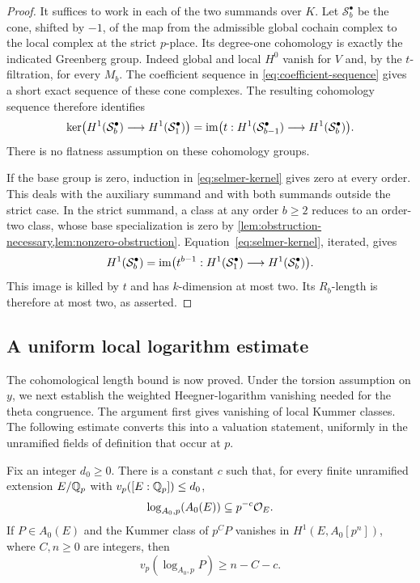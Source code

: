 \begin{proof}
It suffices to work in each of the two summands over $K$.
Let $\mathcal S_b^\bullet$ be the cone, shifted by $-1$, of the
map from the admissible global cochain complex to the local
complex at the strict $p$-place.  Its degree-one cohomology is
exactly the indicated Greenberg group.  Indeed global and local
$H^0$ vanish for $V$ and, by the $t$-filtration, for every $M_b$.
The coefficient sequence in \cref{eq:coefficient-sequence} gives a
short exact sequence of these cone complexes.  The resulting
cohomology sequence therefore identifies
\begin{equation}\label{eq:selmer-kernel}
 \ker\bigl(H^1(\mathcal S_b^\bullet)
       \longrightarrow H^1(\mathcal S_1^\bullet)\bigr)
 =\operatorname{im}\bigl(t:H^1(\mathcal S_{b-1}^\bullet)
       \longrightarrow H^1(\mathcal S_b^\bullet)\bigr).
\end{equation}
There is no flatness assumption on these cohomology groups.

If the base group is zero, induction in \cref{eq:selmer-kernel}
gives zero at every order.  This deals with the auxiliary summand
and with both summands outside the strict case.  In the strict
summand, a class at any order $b\ge2$ reduces to an order-two
class, whose base specialization is zero by
\cref{lem:obstruction-necessary,lem:nonzero-obstruction}.
Equation~\eqref{eq:selmer-kernel}, iterated, gives
\[
 H^1(\mathcal S_b^\bullet)
   =\operatorname{im}\bigl(t^{b-1}:H^1(\mathcal S_1^\bullet)
                    \longrightarrow H^1(\mathcal S_b^\bullet)\bigr).
\]
This image is killed by $t$ and has $k$-dimension at most two.
Its $R_b$-length is therefore at most two, as asserted.
\end{proof}

\subsection{A uniform local logarithm estimate}

The cohomological length bound is now proved.  Under the torsion
assumption on $y$, we next establish the weighted Heegner-logarithm
vanishing needed for the theta congruence.  The argument first gives
vanishing of local Kummer classes.  The following estimate converts
this into a valuation statement, uniformly in the unramified fields
of definition that occur at $p$.

\begin{lemma}\label{lem:uniform-local-log}
Fix an integer $d_0\ge0$.  There is a constant $c$ such that, for
every finite unramified extension $E/\mathbb Q_p$ with
$v_p([E:\mathbb Q_p])\le d_0$,
\begin{equation}\label{eq:uniform-local-log}
 \log_{A_0,p}(A_0(E))\subseteq p^{-c}\mathcal O_E.
\end{equation}
If $P\in A_0(E)$ and the Kummer class of $p^C P$ vanishes in
$H^1(E,A_0[p^n])$, where $C,n\ge0$ are integers, then
\[
 v_p(\log_{A_0,p}P)\ge n-C-c.
\]
\end{lemma}

